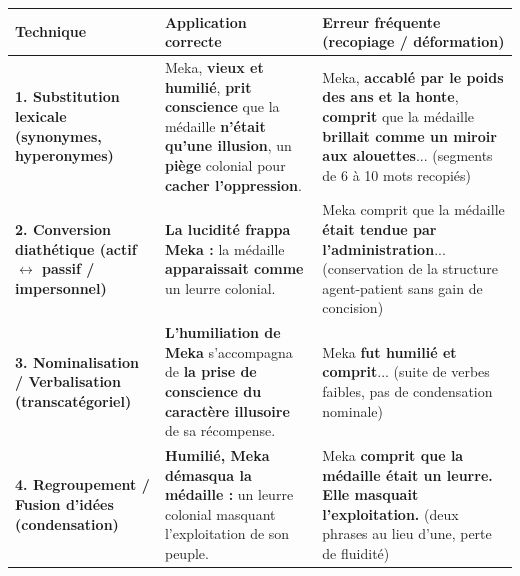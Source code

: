 \documentclass[11pt]{article}
\begin{document}
\begin{center}
\begin{tabularx}{\linewidth}{|l|X|X|}
\hline
\rowcolor{popblueL}
\textbf{Technique} & \textbf{Application correcte} & \textbf{Erreur fréquente (recopiage / déformation)} \\
\hline
\textbf{1. Substitution lexicale (synonymes, hyperonymes)} & Meka, \textbf{vieux et humilié}, \textbf{prit conscience} que la médaille \textbf{n'était qu'une illusion}, un \textbf{piège} colonial pour \textbf{cacher l'oppression}. & Meka, \textbf{accablé par le poids des ans et la honte}, \textbf{comprit} que la médaille \textbf{brillait comme un miroir aux alouettes}... (segments de 6 à 10 mots recopiés) \\
\hline
\textbf{2. Conversion diathétique (actif $\leftrightarrow$ passif / impersonnel)} & \textbf{La lucidité frappa Meka :} la médaille \textbf{apparaissait comme} un leurre colonial. & Meka comprit que la médaille \textbf{était tendue par l'administration}... (conservation de la structure agent-patient sans gain de concision) \\
\hline
\textbf{3. Nominalisation / Verbalisation (transcatégoriel)} & \textbf{L'humiliation de Meka} s'accompagna de \textbf{la prise de conscience du caractère illusoire} de sa récompense. & Meka \textbf{fut humilié et comprit}... (suite de verbes faibles, pas de condensation nominale) \\
\hline
\textbf{4. Regroupement / Fusion d'idées (condensation)} & \textbf{Humilié, Meka démasqua la médaille :} un leurre colonial masquant l'exploitation de son peuple. & Meka \textbf{comprit que la médaille était un leurre.} \textbf{Elle masquait l'exploitation.} (deux phrases au lieu d'une, perte de fluidité) \\
\hline
\end{tabularx}
\end{center}
\end{document}
